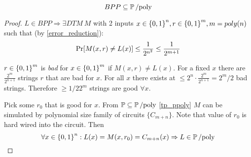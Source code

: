 \begin{theorem}
	\[ BPP \subseteq \operatorname{\operatorname{\mathbb{P}}/poly} \]
\end{theorem}
\begin{proof}
	$L \in BPP \Rightarrow \exists DTM\ M$ with 2 inputs $x \in \operatorname{\{ 0, 1 \}}^n, r \in \operatorname{\{ 0, 1 \}}^m, m = poly(n)$ such that (by \cref{error_reduction}):
	\[ \operatorname{Pr}[M(x, r) \neq L(x)] \leq \frac{1}{2^{n^2}} \leq \frac{1}{2^{m + 1}} \]

	$r \in \operatorname{\{ 0, 1 \}}^m$ is \emph{bad} for $x \in \operatorname{\{ 0, 1 \}}^m$ if $M(x, r) \neq L(x)$.
	For a fixed $x$ there are $\frac{2^m}{2^{n + 1}}$ strings $r$ that are bad for $x$.
	For all $x$ there exists at $\leq 2^n \cdot \frac{2^m}{2^{n + 1}} = 2^m/2$ bad strings.
	Therefore $\geq 1/2 2^m$ strings are good $\forall x$.

	Pick some $r_0$ that is good for $x$.
	From $\operatorname{\mathbb{P}} \subseteq \operatorname{\operatorname{\mathbb{P}}/poly}$ \cref{tp_ppoly} $M$ can be simulated by polynomial size family of circuits $\{ C_{m + n} \}$.
	Note that value of $r_0$ is hard wired into the circuit.
	Then
	\[ \forall x \in \operatorname{\{ 0, 1 \}}^n: L(x) = M(x, r_0) = C_{m + n}(x) \Rightarrow L \in \operatorname{\operatorname{\mathbb{P}}/poly} \]
\end{proof}

